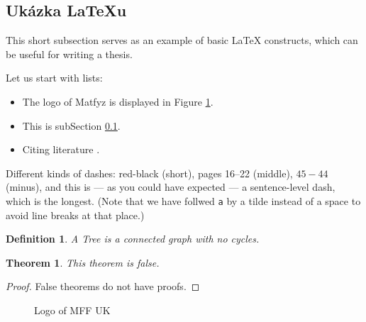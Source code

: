 
\subsection{Ukázka \LaTeX{}u}
\label{ssec:ukazka}

This short subsection serves as an example of basic \LaTeX{} constructs,
which can be useful for writing a thesis.

Let us start with lists:

\begin{itemize}
\item The logo of Matfyz is displayed in Figure \ref{fig:mff}.
\item This is subSection \ref{ssec:ukazka}.
\item Citing literature \cite{lamport94}.
\end{itemize}

Different kinds of dashes:
red-black (short),
pages 16--22 (middle),
$45-44$ (minus),
and this is --- as you could have expected --- a sentence-level dash,
which is the longest.
(Note that we have follwed \verb|a| by a tilde instead of a space
to avoid line breaks at that place.)

\newtheorem{theorem}{Theorem}
\newtheorem*{define}{Definition}	%

\begin{define}
A {\sl Tree} is a connected graph with no cycles.
\end{define}

\begin{theorem}
This theorem is false.
\end{theorem}

\begin{proof}
False theorems do not have proofs.
\end{proof}

\begin{figure}
	\centering
	\caption{Logo of MFF UK}
	\label{fig:mff}
\end{figure}

